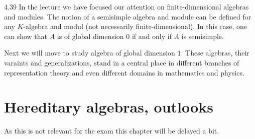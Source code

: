 \documentclass[twoside = false,	%
		headsepline,		%
		parskip = true,
		]{scrbook}						%
\begin{document}
    \begin{remark}{}{4.39}
        In the lecture we have focused our attention on finite-dimensional algebras and modules. The notion of a semisimple algebra and module can be defined for any $K$-algebra and modul (not necessarily finite-dimensional). In this case, one can show that $A$ is of global dimension $0$ if and only if $A$ is semisimple.
    \end{remark}

    Next we will move to study algebra of global dimension $1$. These algebras, their varaints and generalizations, stand in a central place in different branches of representation theory and even different domains in mathematics and physics.

\chapter{Hereditary algebras, outlooks}
    As this is not relevant for the exam this chapter will be delayed a bit.
    
\printbibliography
\end{document}
